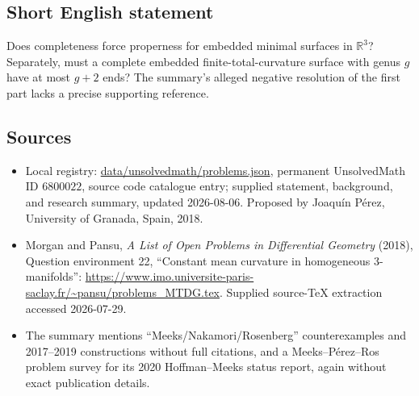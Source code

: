 \documentclass[11pt]{article}
\begin{document}
\subsection{Short English statement}
Does completeness force properness for embedded minimal surfaces in \(\mathbb R^3\)? Separately, must a complete embedded finite-total-curvature surface with genus \(g\) have at most \(g+2\) ends? The summary's alleged negative resolution of the first part lacks a precise supporting reference.
\subsection{Sources}
\begin{itemize}
\item Local registry: \url{data/unsolvedmath/problems.json}, permanent UnsolvedMath ID \(6800022\), source code catalogue entry; supplied statement, background, and research summary, updated 2026-08-06. Proposed by Joaquín P\'erez, University of Granada, Spain, 2018.
\item Morgan and Pansu, \emph{A List of Open Problems in Differential Geometry} (2018), Question environment 22, ``Constant mean curvature in homogeneous 3-manifolds'': \url{https://www.imo.universite-paris-saclay.fr/~pansu/problems_MTDG.tex}. Supplied source-TeX extraction accessed 2026-07-29.
\item The summary mentions ``Meeks/Nakamori/Rosenberg'' counterexamples and 2017--2019 constructions without full citations, and a Meeks--P\'erez--Ros problem survey for its 2020 Hoffman--Meeks status report, again without exact publication details.
\end{itemize}
\end{document}
